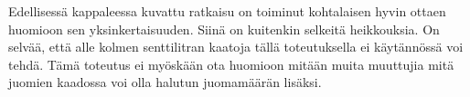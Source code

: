 Edellisessä kappaleessa kuvattu ratkaisu on toiminut kohtalaisen hyvin ottaen huomioon sen yksinkertaisuuden. Siinä on kuitenkin selkeitä heikkouksia. On selvää, että alle kolmen senttilitran kaatoja tällä toteutuksella ei käytännössä voi tehdä. Tämä toteutus ei myöskään ota huomioon mitään muita muuttujia mitä juomien kaadossa voi olla halutun juomamäärän lisäksi.
